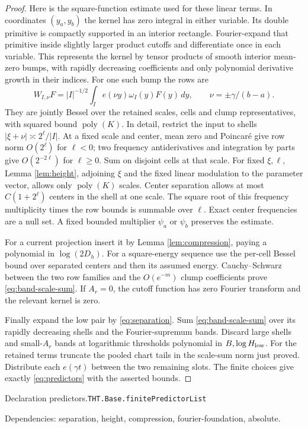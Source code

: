 \documentclass[11pt]{article}
\theoremstyle{definition}
\newcommand{\poly}{\operatorname{poly}}
\numberwithin{equation}{section}
\newcommand{\bp}[3]{\par\smallskip\begingroup\footnotesize
\noindent\hypertarget{bp:#1}{\textsf{Declaration #1.}}\quad\nolinkurl{#2}\par
\noindent\textsf{Dependencies:} #3.\par\endgroup\smallskip}
\begin{document}
\begin{proof}
Here is the square-function estimate used for these linear terms. In coordinates $(y_a,y_b)$ the kernel has zero integral in either variable. Its double primitive is compactly supported in an interior rectangle. Fourier-expand that primitive inside slightly larger product cutoffs and differentiate once in each variable. This represents the kernel by tensor products of smooth interior mean-zero bumps, with rapidly decreasing coefficients and only polynomial derivative growth in their indices. For one such bump the rows are
\[
 W_{I,\nu}F=|I|^{-1/2}\int_Ie(\nu y)\omega_I(y)F(y)\,dy,
 \qquad \nu=\pm\gamma/(b-a).
\]
They are jointly Bessel over the retained scales, cells and clump representatives, with squared bound $\poly(K)$. In detail, restrict the input to shells $|\xi+\nu|\asymp2^\ell/|I|$. At a fixed scale and center, mean zero and Poincaré give row norm $O(2^\ell)$ for $\ell<0$; two frequency antiderivatives and integration by parts give $O(2^{-2\ell})$ for $\ell\ge0$. Sum on disjoint cells at that scale. For fixed $\xi,\ell$, Lemma \ref{lem:height}, adjoining $\xi$ and the fixed linear modulation to the parameter vector, allows only $\poly(K)$ scales. Center separation allows at most $C(1+2^\ell)$ centers in the shell at one scale. The square root of this frequency multiplicity times the row bounds is summable over $\ell$. Exact center frequencies are a null set. A fixed bounded multiplier $\psi_a$ or $\psi_b$ preserves the estimate.

For a current projection insert it by Lemma \ref{lem:compression}, paying a polynomial in $\log(2D_h)$. For a square-energy sequence use the per-cell Bessel bound over separated centers and then its assumed energy. Cauchy--Schwarz between the two row families and the $O(e^{-m})$ clump coefficients prove \eqref{eq:band-scale-sum}. If $A_r=0$, the cutoff function has zero Fourier transform and the relevant kernel is zero.

Finally expand the low pair by \eqref{eq:separation}. Sum \eqref{eq:band-scale-sum} over its rapidly decreasing shells and the Fourier-supremum bands. Discard large shells and small-$A_r$ bands at logarithmic thresholds polynomial in $B,\log H_{\rm low}$. For the retained terms truncate the pooled chart tails in the scale-sum norm just proved. Distribute each $e(\gamma t)$ between the two remaining slots. The finite choices give exactly \eqref{eq:predictors} with the asserted bounds.
\end{proof}
\bp{predictors}{THT.Base.finitePredictorList}{separation, height, compression, fourier-foundation, absolute}
\end{document}
